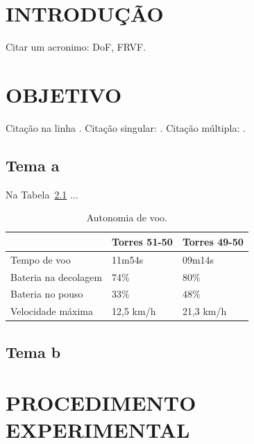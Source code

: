 \chapter{INTRODUÇÃO}
\label{chap:introduction}

Citar um acronimo: \ac{DoF}, \ac{FRVF}.

\lipsum[1-2]

\chapter{OBJETIVO}
\label{chap:objetive}

Citação na linha .
Citação singular: \cite{earnshaw2014virtual}. Citação múltipla: \cite{azuma1997survey, muller2007documentation}.

\section{Tema a}

\lipsum[1]

Na Tabela~\ref{tab:tabela-autonomia} ...

\begin{table}[htb]
	\centering
	\caption{Autonomia de voo.}
	\label{tab:tabela-autonomia}
	\begin{tabular}{l|l|l|}
		\cline{2-3} & Torres 51-50 & Torres 49-50 \\ \hline
		\multicolumn{1}{|l|}{Tempo de voo}         & 11m54s       & 09m14s       \\ \hline
		\multicolumn{1}{|l|}{Bateria na decolagem} & 74\%         & 80\%         \\ \hline
		\multicolumn{1}{|l|}{Bateria no pouso}     & 33\%         & 48\%         \\ \hline
		\multicolumn{1}{|l|}{Velocidade máxima}    & 12,5 km/h    & 21,3 km/h    \\ \hline
	\end{tabular}
\end{table}

\section{Tema b}

\lipsum[1]

\chapter{PROCEDIMENTO EXPERIMENTAL} 
\label{chap:methodology}

